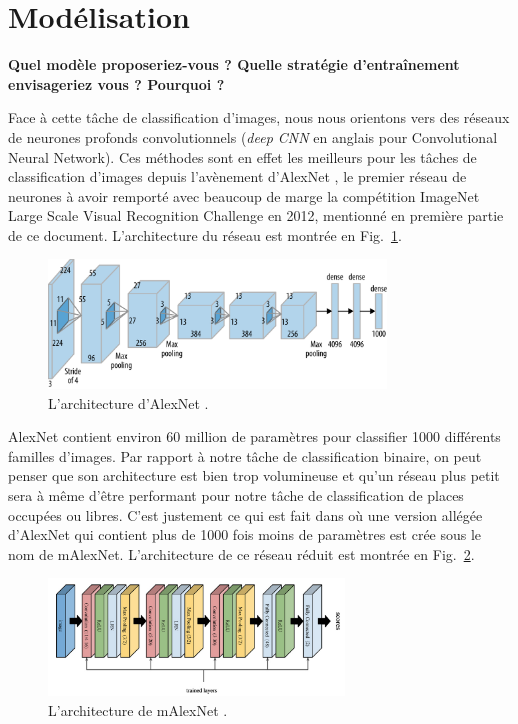\documentclass[12pt]{article}
\begin{document}
\section{Modélisation}

\textbf{Quel modèle proposeriez-vous ? Quelle stratégie d'entraînement envisageriez vous ? Pourquoi ?}

Face à cette tâche de classification d'images, nous nous orientons vers des réseaux de neurones profonds convolutionnels (\textit{deep CNN} en anglais pour Convolutional Neural Network). Ces méthodes sont en effet les meilleurs pour les tâches de classification d'images depuis l'avènement d'AlexNet \citep{alexnet}, le premier réseau de neurones à avoir remporté avec beaucoup de marge la compétition ImageNet Large Scale Visual Recognition Challenge en 2012, mentionné en première partie de ce document. L'architecture du réseau est montrée en Fig.~\ref{fig:alexnet}.

\begin{figure}[htbp]
    \centering
    \includegraphics[width=0.8\textwidth]{figures/networks/alexnet.png}
    \caption{L'architecture d'AlexNet \citep{alexnet}.}
    \label{fig:alexnet}
\end{figure}

AlexNet contient environ 60 million de paramètres pour classifier 1000 différents familles d'images. Par rapport à notre tâche de classification binaire, on peut penser que son architecture est bien trop volumineuse et qu'un réseau plus petit sera à même d'être performant pour notre tâche de classification de places occupées ou libres. C'est justement ce qui est fait dans \citep{Amato2017} où une version allégée d'AlexNet qui contient plus de 1000 fois moins de paramètres est crée sous le nom de mAlexNet. L'architecture de ce réseau réduit est montrée en Fig.~\ref{fig:malexnet}.

\begin{figure}[htbp]
    \centering
    \includegraphics[width=0.7\textwidth]{figures/networks/malexnet.png}
    \caption{L'architecture de mAlexNet \citep{Amato2017}.}
    \label{fig:malexnet}
\end{figure}
\end{document}
